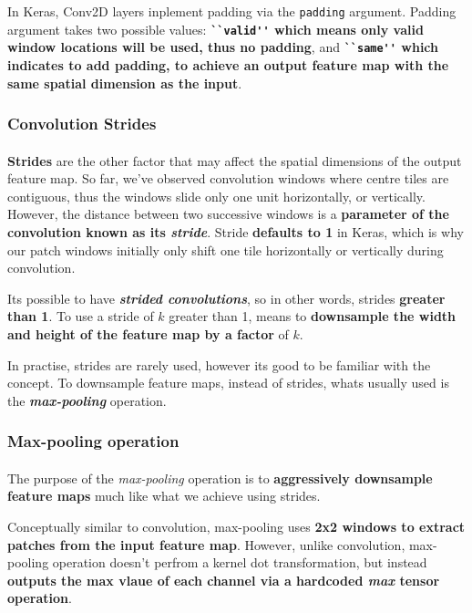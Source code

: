 \documentclass[12pt, a4paper]{article}
\begin{document}
In Keras, Conv2D layers inplement padding via the \lstinline{padding} argument.
Padding argument takes two possible values: \textbf{\lstinline{``valid''} which means only valid window locations 
will be used, thus no padding}, and \textbf{\lstinline{``same''} which indicates to add padding,
to achieve an output feature map with the same spatial dimension as the input}.

\subsubsection{Convolution Strides}
\paragraph*{}
\textbf{Strides} are the other factor that may affect the spatial dimensions of the output feature  map.
So far, we've observed convolution windows where centre tiles are contiguous,
thus the windows slide only one unit horizontally, or vertically.
However, the distance between two successive windows is a \textbf{parameter 
of the convolution known as its \textit{stride}}. Stride \textbf{defaults to 1} in Keras,
which is why our patch windows initially only shift one tile horizontally or vertically during 
convolution.

Its possible to have \textbf{\textit{strided convolutions}}, so in other words,
strides \textbf{greater than 1}. To use a stride of $k$ greater than 1, means 
to \textbf{downsample the width and height of the feature map by a factor} of $k$.

In practise, strides are rarely used, however its good to be familiar with the concept.
To downsample feature maps, instead of strides, whats usually used is the 
\textbf{\textit{max-pooling}} operation.

\subsubsection{Max-pooling operation}
\paragraph*{}
The purpose of the \textit{max-pooling} operation is to \textbf{aggressively 
downsample feature maps} much like what we achieve using strides.

Conceptually similar to convolution, max-pooling uses \textbf{2x2 windows to extract patches 
from the input feature map}. However, unlike convolution, max-pooling operation doesn't 
perfrom a kernel dot transformation, but instead \textbf{outputs the max vlaue of each channel
via a hardcoded \textit{max} tensor operation}.
\end{document}
